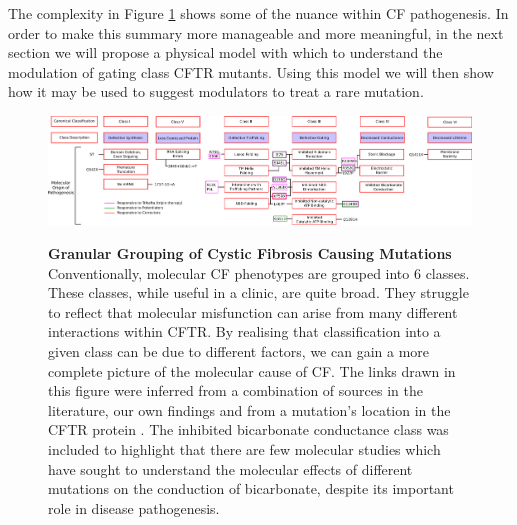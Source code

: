 The complexity in Figure \ref{granular_classification} shows some of the nuance within CF pathogenesis. In order to make this summary more manageable and more meaningful, in the next section we will propose a physical model with which to understand the modulation of gating class CFTR mutants. Using this model we will then show how it may be used to suggest modulators to treat a rare mutation.

\begin{landscape}
\begin{figure}
	\begin{center}
	\includegraphics[width=1.5\textwidth]{figures/perspective/classes_mutations.pdf}\\
	\end{center}
	\captionsetup{singlelinecheck = false, justification=raggedright}
	\caption[Granular grouping of CF pathogenesis]{\textbf{Granular Grouping of Cystic Fibrosis Causing Mutations}{ Conventionally, molecular CF phenotypes are grouped into 6 classes. These classes, while useful in a clinic, are quite broad. They struggle to reflect that molecular misfunction can arise from many different interactions within CFTR. By realising that classification into a given class can be due to different factors, we can gain a more complete picture of the molecular cause of CF. The links drawn in this figure were inferred from a combination of sources in the literature, our own findings and from a mutation's location in the CFTR protein \cite{bompadre2007, yeh2019a, gong2004, wong2022, vangoor2009, vangoor2014, hoffmann2018, thelin2007, gene2008, trikafta_website, phuan2018, ensinck2022}. The inhibited bicarbonate conductance class was included to highlight that there are few molecular studies which have sought to understand the molecular effects of different mutations on the conduction of bicarbonate, despite its important role in disease pathogenesis. }
	}

	\label{granular_classification}
\end{figure}
\end{landscape}

